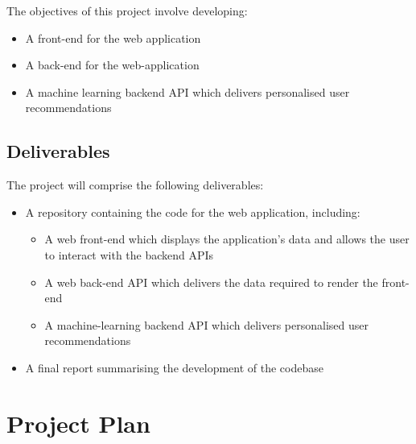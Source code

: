 The objectives of this project involve developing:

\begin{itemize}
    \item A front-end for the web application
    \item A back-end for the web-application
    \item A machine learning backend API which delivers personalised user recommendations

\end{itemize}

\subsection{Deliverables}


The project will comprise the following deliverables:
\begin{itemize}
    \item A repository containing the code for the web application, including:
        \begin{itemize}
            \item A web front-end which displays the application's data and allows the user to interact with the backend APIs
            \item A web back-end API which delivers the data required to render the front-end
            \item A machine-learning backend API which delivers personalised user recommendations 
        \end{itemize}
    \item A final report summarising the development of the codebase
\end{itemize}

%   
%
\section{Project Plan}



